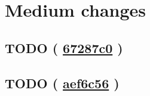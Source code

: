 \documentclass{article}
\newcommand{\gh}[1]{%
  \href{https://github.com/awave1/assessment-loan-system/commit/#1}{#1}%
}
\begin{document}





\section*{Medium changes}

\subsection*{TODO (\gh{67287c0})}






\subsection*{TODO (\gh{aef6c56})}
\end{document}
